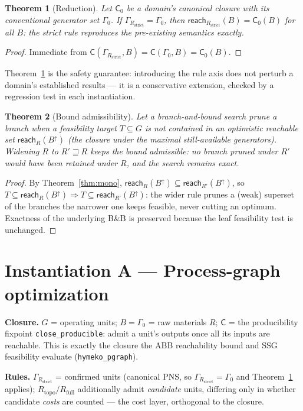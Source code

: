 \documentclass[11pt,a4paper]{article}
\theoremstyle{definition}
\theoremstyle{plain}
\newtheorem{theorem}{Theorem}
\theoremstyle{remark}
\newcommand{\Cl}{\mathsf{C}}
\newcommand{\Rstrict}{R_{\mathrm{strict}}}
\newcommand{\Rtopo}{R_{\mathrm{topo}}}
\newcommand{\Rfull}{R_{\mathrm{full}}}
\newcommand{\reach}{\mathsf{reach}}
\begin{document}
\begin{theorem}[Reduction]
\label{thm:reduction}
Let $\Cl_0$ be a domain's canonical closure with its conventional generator set
$\Gamma_0$. If $\Gamma_{\Rstrict}=\Gamma_0$, then
$\reach_{\Rstrict}(B)=\Cl_0(B)$ for all $B$: the strict rule reproduces the
pre-existing semantics exactly.
\end{theorem}
\begin{proof}
Immediate from $\Cl(\Gamma_{\Rstrict},B)=\Cl(\Gamma_0,B)=\Cl_0(B)$.
\end{proof}

Theorem~\ref{thm:reduction} is the safety guarantee: introducing the rule axis
does not perturb a domain's established results --- it is a conservative
extension, checked by a regression test in each instantiation.

\begin{theorem}[Bound admissibility]
\label{thm:admiss}
Let a branch-and-bound search prune a branch when a feasibility target
$T\subseteq G$ is not contained in an \emph{optimistic} reachable set
$\reach_{R}(B^{\uparrow})$ (the closure under the maximal still-available
generators). Widening $R$ to $R'\sqsupseteq R$ keeps the bound \emph{admissible}:
no branch pruned under $R'$ would have been retained under $R$, and the search
remains exact.
\end{theorem}
\begin{proof}
By Theorem~\ref{thm:mono}, $\reach_{R}(B^{\uparrow})\subseteq
\reach_{R'}(B^{\uparrow})$, so $T\subseteq\reach_{R}(B^{\uparrow})\Rightarrow
T\subseteq\reach_{R'}(B^{\uparrow})$: the wider rule prunes a (weak) superset of
the branches the narrower one keeps feasible, never cutting an optimum. Exactness
of the underlying B\&B is preserved because the leaf feasibility test is unchanged.
\end{proof}

\section{Instantiation A --- Process-graph optimization}
\label{sec:pgraph}

\textbf{Closure.} $G$ = operating units; $B=\Gamma_0$ = raw materials $R$;
$\Cl$ = the producibility fixpoint \texttt{close\_producible}: admit a unit's
outputs once all its inputs are reachable. This is exactly the closure the ABB
reachability bound and SSG feasibility evaluate (\texttt{hymeko\_pgraph}).

\textbf{Rules.} $\Gamma_{\Rstrict}$ = confirmed units (canonical PNS, so
$\Gamma_{\Rstrict}=\Gamma_0$ and Theorem~\ref{thm:reduction} applies);
$\Rtopo/\Rfull$ additionally admit \emph{candidate} units, differing only in
whether candidate \emph{costs} are counted --- the cost layer, orthogonal to the
closure.
\end{document}
